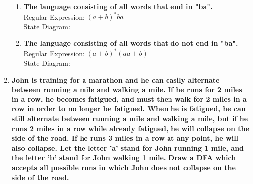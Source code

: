 \begin{enumerate}
\begin{enumerate}
    \item \textbf{The language consisting of all words that end in "ba".}
    \\
    
    Regular Expression: $(a+b)^*ba$
    \\
    State Diagram:\\

    \item \textbf{The language consisting of all words that do not end in "ba".}
    \\
    Regular Expression: $(a+b)^*(aa + b)$
    \\
    State Diagram:\\

\end{enumerate}
\newpage
		
\item \textbf{John is training for a marathon and he can easily alternate between running a mile and walking a mile. If he runs for 2 miles in a row, he becomes fatigued, and must then walk for 2 miles in a row in order to no longer be fatigued. When he is fatigued, he can still alternate between running a mile and walking a mile, but if he runs 2 miles in a row while already fatigued, he will collapse on the side of the road. If he runs 3 miles in a row at any point, he will also collapse. Let the letter 'a' stand for John running 1 mile, and the letter 'b' stand for John walking 1 mile. Draw a DFA which accepts all possible runs in which John does not collapse on the side of the road.}


\end{enumerate}
